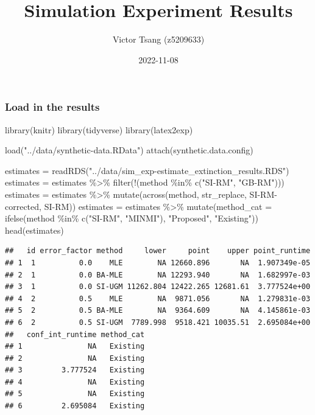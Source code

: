 \documentclass[
]{article}
\title{Simulation Experiment Results}
\author{Victor Tsang (z5209633)}
\date{2022-11-08}
\newenvironment{Shaded}{\begin{snugshade}}{\end{snugshade}}
\newcommand{\AttributeTok}[1]{\textcolor[rgb]{0.77,0.63,0.00}{#1}}
\newcommand{\FunctionTok}[1]{\textcolor[rgb]{0.00,0.00,0.00}{#1}}
\newcommand{\NormalTok}[1]{#1}
\newcommand{\OtherTok}[1]{\textcolor[rgb]{0.56,0.35,0.01}{#1}}
\newcommand{\SpecialCharTok}[1]{\textcolor[rgb]{0.00,0.00,0.00}{#1}}
\newcommand{\StringTok}[1]{\textcolor[rgb]{0.31,0.60,0.02}{#1}}
\begin{document}
\maketitle

\hypertarget{load-in-the-results}{%
\subsubsection{Load in the results}\label{load-in-the-results}}

\begin{Shaded}
\begin{Highlighting}[]
\FunctionTok{library}\NormalTok{(knitr)}
\FunctionTok{library}\NormalTok{(tidyverse)}
\FunctionTok{library}\NormalTok{(latex2exp)}

\FunctionTok{load}\NormalTok{(}\StringTok{"../data/synthetic{-}data.RData"}\NormalTok{)}
\FunctionTok{attach}\NormalTok{(synthetic.data.config)}

\NormalTok{estimates }\OtherTok{=} \FunctionTok{readRDS}\NormalTok{(}\StringTok{"../data/sim\_exp{-}estimate\_extinction\_results.RDS"}\NormalTok{)}
\NormalTok{estimates }\OtherTok{=}\NormalTok{ estimates }\SpecialCharTok{\%\textgreater{}\%} \FunctionTok{filter}\NormalTok{(}\SpecialCharTok{!}\NormalTok{(method }\SpecialCharTok{\%in\%} \FunctionTok{c}\NormalTok{(}\StringTok{"SI{-}RM"}\NormalTok{, }\StringTok{"GB{-}RM"}\NormalTok{)))}
\NormalTok{estimates }\OtherTok{=}\NormalTok{ estimates }\SpecialCharTok{\%\textgreater{}\%} \FunctionTok{mutate}\NormalTok{(}\FunctionTok{across}\NormalTok{(method, str\_replace, }\StringTok{\textquotesingle{}SI{-}RM{-}corrected\textquotesingle{}}\NormalTok{, }\StringTok{\textquotesingle{}SI{-}RM\textquotesingle{}}\NormalTok{))}
\NormalTok{estimates }\OtherTok{=}\NormalTok{ estimates }\SpecialCharTok{\%\textgreater{}\%} \FunctionTok{mutate}\NormalTok{(}\AttributeTok{method\_cat =} \FunctionTok{ifelse}\NormalTok{(method }\SpecialCharTok{\%in\%} \FunctionTok{c}\NormalTok{(}\StringTok{"SI{-}RM"}\NormalTok{, }\StringTok{"MINMI"}\NormalTok{), }\StringTok{"Proposed"}\NormalTok{, }\StringTok{"Existing"}\NormalTok{))}
\FunctionTok{head}\NormalTok{(estimates)}
\end{Highlighting}
\end{Shaded}

\begin{verbatim}
##   id error_factor method     lower     point    upper point_runtime
## 1  1          0.0    MLE        NA 12660.896       NA  1.907349e-05
## 2  1          0.0 BA-MLE        NA 12293.940       NA  1.682997e-03
## 3  1          0.0 SI-UGM 11262.804 12422.265 12681.61  3.777524e+00
## 4  2          0.5    MLE        NA  9871.056       NA  1.279831e-03
## 5  2          0.5 BA-MLE        NA  9364.609       NA  4.145861e-03
## 6  2          0.5 SI-UGM  7789.998  9518.421 10035.51  2.695084e+00
##   conf_int_runtime method_cat
## 1               NA   Existing
## 2               NA   Existing
## 3         3.777524   Existing
## 4               NA   Existing
## 5               NA   Existing
## 6         2.695084   Existing
\end{verbatim}
\end{document}
